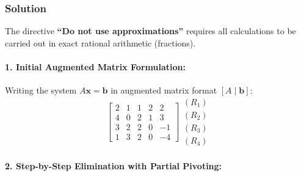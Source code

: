 \documentclass[11pt,a4paper]{article}
\begin{document}
\subsubsection*{Solution}

The directive \textbf{``Do not use approximations''} requires all calculations to be carried out in exact rational arithmetic (fractions).

\paragraph{1. Initial Augmented Matrix Formulation:}
Writing the system $A\mathbf{x} = \mathbf{b}$ in augmented matrix format $[A \mid \mathbf{b}]$:
\[
\left[\begin{array}{cccc|c}
2 & 1 & 1 & 2 & 2 \\
4 & 0 & 2 & 1 & 3 \\
3 & 2 & 2 & 0 & -1 \\
1 & 3 & 2 & 0 & -4
\end{array}\right]
\begin{matrix}
(R_1) \\ (R_2) \\ (R_3) \\ (R_4)
\end{matrix}
\]

\paragraph{2. Step-by-Step Elimination with Partial Pivoting:}
\end{document}

